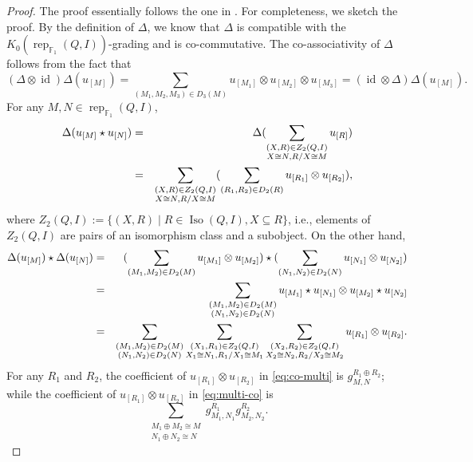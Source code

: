 \documentclass[12pt]{amsart}
\theoremstyle{remark}
\theoremstyle{definition}
\numberwithin{equation}{section}
\begin{document}
\begin{proof}
    The proof essentially follows the one in \cite{Sz12}.
    For completeness, we sketch the proof.   By the definition of $\Delta$, we know that $\Delta$ is compatible with the $K_0(\operatorname{rep}_{\mathbb{F}_1}(Q,I))$-grading and is co-commutative. The co-associativity of $\Delta$ follows from the fact that
    \[
    (\Delta\otimes \operatorname{id})\Delta(u_{[{M}]})=\sum_{({M}_1,{M}_2,{M}_3)\in D_3({M})}u_{[{M_1}]}\otimes u_{[{M}_2]}\otimes u_{[{M}_3]}=(\operatorname{id}\otimes \Delta)\Delta(u_{[{M}]}).
    \]
    For any ${M},{N}\in \operatorname{rep}_{\mathbb{F}_1}(Q,I)$,
    \begin{eqnarray}\label{eq:co-multi}
        \Delta(u_{[{M}]}\star u_{[{N}]})&=&\Delta(\sum_{\substack{({X},{R})\in Z_2(Q,I)\\ {X}\cong{N},{R}/{X}\cong{M}}}u_{[{R}]})\notag\\
        &=&\sum_{\substack{({X},{R})\in Z_2(Q,I)\\ {X}\cong{N},{R}/{X}\cong {M}}}(\sum_{({R}_1,{R}_2)\in D_2({R})}u_{[{R}_1]}\otimes u_{[{R}_2]}),
    \end{eqnarray}
    where $Z_2(Q,I):=\{({X},{R})\mid {R}\in \operatorname{Iso}(Q,I),{X}\subseteq {R}\}$, i.e., elements of $Z_2(Q,I)$ are pairs of an isomorphism class and a subobject.
    On the other hand, 
    \begin{eqnarray}\label{eq:multi-co}
        \Delta(u_{[{M}]})\star\Delta(u_{[{N}]})&=&(\sum_{({M}_1,{M}_2)\in D_2({M})}u_{[{M}_1]}\otimes u_{[{M}_2]})\star(\sum_{({N}_1,{N}_2)\in D_2({N})}u_{[{N}_1]}\otimes u_{[{N}_2]})\notag\\
        &=&\sum_{\substack{({M}_1,{M}_2)\in D_2({M})\\ ({N}_1,{N}_2)\in D_2({N})}}u_{[{M}_1]}\star u_{[{N}_1]}\otimes u_{[{M}_2]}\star u_{[{N}_2]}\notag\\
        &=&\sum_{\substack{({M}_1,{M}_2)\in D_2({M})\\ ({N}_1,{N}_2)\in D_2({N})}}\sum_{\substack{({X}_1,{R}_1)\in Z_2(Q,I)\\ {X}_1\cong {N}_1,{R}_1/{X}_1\cong {M}_1}}\sum_{\substack{({X}_2,{R}_2)\in Z_2(Q,I)\\ {X}_2\cong {N}_2,{R}_2/{X}_2\cong {M}_2}}u_{[{R}_1]}\otimes u_{[{R}_2]}.
    \end{eqnarray}
    For any $R_1$ and $R_2$, the coefficient of $u_{[R_1]}\otimes u_{[R_2]}$ in \eqref{eq:co-multi} is $g_{M,N}^{R_1\oplus R_2}$; while the coefficient of $u_{[R_1]}\otimes u_{[R_2]}$ in \eqref{eq:multi-co} is
    \[
    \sum_{\substack{M_1\oplus M_2\cong M\\ N_1\oplus N_2\cong N}}g_{M_1,N_1}^{R_1}g_{M_2,N_2}^{R_2}.
    \]
    

\end{proof}
\end{document}
